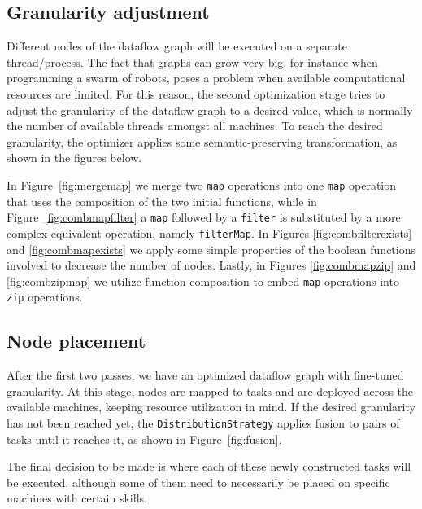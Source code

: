 \documentclass[sigplan,screen]{acmart}
\begin{document}
\subsection{Granularity adjustment}
Different nodes of the dataflow graph will be executed on a separate
thread/process. The fact that graphs can grow very big, for instance when
programming a swarm of robots, poses a problem when available
computational resources are limited. For this reason, the second optimization
stage tries to adjust the granularity of the dataflow graph to a desired value,
which is normally the number of available threads amongst all machines.
To reach the desired granularity, the optimizer applies some semantic-preserving
transformation, as shown in the figures below.


In Figure~\ref{fig:mergemap} we merge two \texttt{map} operations into
one \texttt{map} operation that uses the composition of the two initial
functions, while in Figure~\ref{fig:combmapfilter} a \texttt{map} followed
by a \texttt{filter} is substituted by a more complex equivalent operation,
namely \texttt{filterMap}. In Figures \ref{fig:combfilterexists} and
\ref{fig:combmapexists} we apply some simple properties of the boolean functions
involved to decrease the number of nodes. Lastly, in Figures \ref{fig:combmapzip} and
\ref{fig:combzipmap} we utilize function composition to embed \texttt{map}
operations into \texttt{zip} operations.

\subsection{Node placement}

After the first two passes, we have an optimized dataflow graph with fine-tuned
granularity. At this stage, nodes are mapped to tasks and are deployed across
the available machines, keeping resource utilization in mind.
If the desired granularity has not been reached yet, the
\texttt{DistributionStrategy} applies fusion to pairs of tasks until it reaches
it, as shown in Figure~\ref{fig:fusion}.
%

The final decision to be made is where each of these newly constructed tasks
will be executed, although some of them need to necessarily be placed on
specific machines with certain skills.
\end{document}
